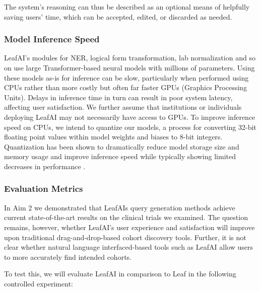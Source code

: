 \documentclass[../main.tex]{subfiles}
\begin{document}
The system's reasoning can thus be described as an optional means of helpfully saving users' time, which can be accepted, edited, or discarded as needed.

\subsubsection{Model Inference Speed}

LeafAI's modules for NER, logical form transformation, lab normalization and so on use large Transformer-based neural models \cite{vaswani2017attention} with millions of parameters. Using these models as-is for inference can be slow, particularly when performed using CPUs rather than more costly but often far faster GPUs (Graphics Processing Units). Delays in inference time in turn can result in poor system latency, affecting user satisfaction. We further assume that institutions or individuals deploying LeafAI may not necessarily have access to GPUs. To improve inference speed on CPUs, we intend to quantize our models, a process for converting 32-bit floating point values within model weights and biases to 8-bit integers. Quantization has been shown to dramatically reduce model storage size and memory usage and improve inference speed while typically showing limited decreases in performance \cite{hubara2017quantized}. 

\subsubsection{Evaluation Metrics}

In Aim 2 we demonstrated that LeafAIs query generation methods achieve current state-of-the-art results on the clinical trials we examined. The question remains, however, whether LeafAI's user experience and satisfaction will improve upon traditional drag-and-drop-based cohort discovery tools. Further, it is not clear whether natural language interfaced-based tools such as LeafAI allow users to more accurately find intended cohorts.

To test this, we will evaluate LeafAI in comparison to Leaf in the following controlled experiment: 
\end{document}
